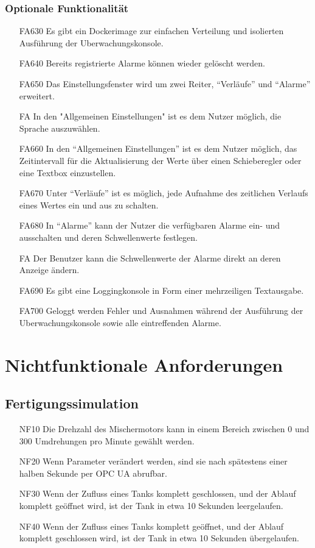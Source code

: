 \documentclass[parskip=full]{scrartcl}
\begin{document}
\subsubsection{Optionale Funktionalität}
\label{konsole-optional}
\begin{enumerate}
  \item[FA630] Es gibt ein \gls{Dockerimage} zur einfachen Verteilung und isolierten Ausführung der \gls{Uberwachungskonsole}.
  \item[FA640] Bereits registrierte Alarme können wieder gelöscht werden.
  \item[FA650] Das Einstellungsfenster wird um zwei Reiter, "`Verläufe"' und "`Alarme"' erweitert.
  \item[FA] In den "Allgemeinen Einstellungen" ist es dem Nutzer möglich, die Sprache auszuwählen.
  \item[FA660] In den "`Allgemeinen Einstellungen"' ist es dem Nutzer möglich, das Zeitintervall für die Aktualisierung der Werte über einen Schieberegler oder eine Textbox einzustellen.
  \item[FA670] Unter "`Verläufe"' ist es möglich, jede Aufnahme des zeitlichen Verlaufs eines Wertes ein und aus zu schalten.
  \item[FA680] In "`Alarme"' kann der Nutzer die verfügbaren Alarme ein- und ausschalten und deren Schwellenwerte festlegen.
  \item[FA] Der Benutzer kann die Schwellenwerte der Alarme direkt an deren Anzeige ändern.
  \item[FA690] Es gibt eine Loggingkonsole in Form einer mehrzeiligen Textausgabe.
  \item[FA700] Geloggt werden Fehler und Ausnahmen während der Ausführung der \gls{Uberwachungskonsole} sowie alle eintreffenden Alarme.
\end{enumerate}

\pagebreak
\section{Nichtfunktionale Anforderungen}
\subsection{Fertigungssimulation}
\begin{enumerate}
  \item[NF10] Die Drehzahl des Mischermotors kann in einem Bereich zwischen 0 und 300 Umdrehungen pro Minute gewählt werden.
  \item[NF20] Wenn Parameter verändert werden, sind sie nach spätestens einer halben Sekunde per \gls{OPC UA} abrufbar.
  \item[NF30] Wenn der Zufluss eines Tanks komplett geschlossen, und der Ablauf komplett geöffnet wird, ist der Tank in etwa 10 Sekunden leergelaufen.
  \item[NF40] Wenn der Zufluss eines Tanks komplett geöffnet, und der Ablauf komplett geschlossen wird, ist der Tank in etwa 10 Sekunden übergelaufen.
\end{enumerate}
\end{document}
